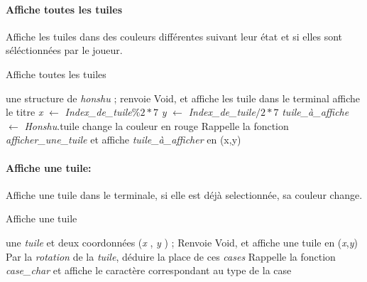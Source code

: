 \documentclass[10pt]{article}
\begin{document}
  \paragraph{Affiche toutes les tuiles}
  Affiche les tuiles dans des couleurs différentes suivant leur état et si elles sont séléctionnées par le joueur.
  \begin{algorithm}
    \caption{Affiche toutes les tuiles}
    \begin{algorithmic}
      \REQUIRE  une structure de \textit{honshu} ;
      \ENSURE renvoie Void, et affiche les tuile dans le terminal
      \STATE affiche le titre
      \STATE \textit{x} $\leftarrow$ \textit{Index\_de\_tuile}$\% 2 * 7$
      \STATE \textit{y} $\leftarrow$ \textit{Index\_de\_tuile}$/ 2 * 7$
      \STATE \textit{tuile\_à\_affiche} $\leftarrow$ \textit{Honshu}.tuile
      \STATE change la couleur en rouge
      \ENDIF
      \STATE Rappelle la fonction \textit{afficher\_une\_tuile} et affiche \textit{tuile\_à\_afficher} en (x,y)
      \ENDFOR
    \end{algorithmic}
  \end{algorithm}
  \paragraph{Affiche une tuile:}
  Affiche une tuile dans le terminale, si elle est déjà selectionnée, sa couleur change.
  \begin{algorithm}
    \caption{Affiche une tuile}
    \begin{algorithmic}
      \REQUIRE  une \textit{tuile} et deux coordonnées (\textit{x} , \textit{y} ) ; 
      \ENSURE Renvoie Void, et affiche une tuile en (\textit{x},\textit{y})
      \STATE Par la \textit{rotation} de la \textit{tuile}, déduire la place de ces \textit{cases}
      \STATE Rappelle la fonction \textit{case\_char} et affiche le caractère correspondant au type de la case
      \ENDFOR
    \end{algorithmic}
  \end{algorithm}						
\end{document}
